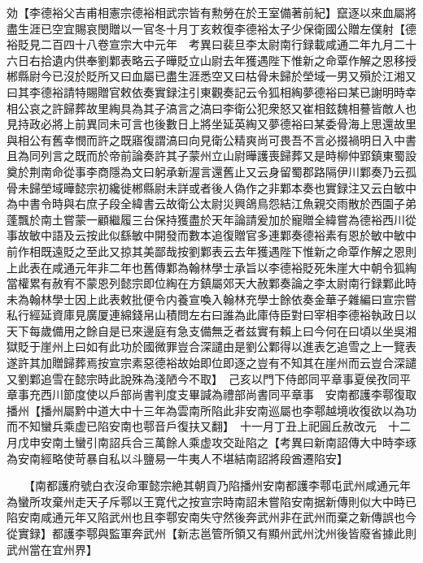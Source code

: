 効【李德裕父吉甫相憲宗德裕相武宗皆有勲勞在於王室備著前紀】竄逐以來血屬將盡生涯已空宜賜哀閔贈以一官冬十月丁亥敕復李德裕太子少保衛國公贈左僕射【德裕貶見二百四十八卷宣宗大中元年　考異曰裴旦李太尉南行録載咸通二年九月二十六日右拾遺内供奉劉鄴表略云子曄貶立山尉去年獲遇陛下惟新之命覃作解之恩移授郴縣尉今已沒於貶所又曰血屬已盡生涯悉空又曰枯骨未歸於塋域一男又殞於江湘又曰其李德裕請特賜贈官敕依奏實録注引東觀奏記云令狐相綯夢德裕曰某已謝明時幸相公哀之許歸葬故里綯具為其子滈言之滈曰李衛公犯衆怒又崔相鉉魏相謩皆敵人也見持政必將上前異同未可言也後數日上將坐延英綯又夢德裕曰某委骨海上思還故里與相公有舊幸憫而許之既寤復謂滈曰向見衛公精爽尚可畏吾不言必掇禍明日入中書且為同列言之既而於帝前論奏許其子蒙州立山尉曄護喪歸葬又是時柳仲郢鎮東蜀設奠於荆南命從事李商隱為文曰躬承新渥言還舊止又云身留蜀郡路隔伊川鄴奏乃云孤骨未歸塋域曄懿宗初纔徙郴縣尉未詳或者後人偽作之非鄴本奏也實録注又云白敏中為中書令時與右庶子段全緯書云故衛公太尉災興鴿鳥怨結江魚親交雨散於西園子弟蓬飄於南土嘗蒙一顧繼履三台保持獲盡於天年論請爰加於寵贈全緯嘗為德裕西川從事故敏中語及云按此似繇敏中開發而數本追復贈官多連鄴奏德裕素有恩於敏中敏中前作相既遠貶之至此又掠其美鄙哉按劉鄴表云去年獲遇陛下惟新之命覃作解之恩則上此表在咸通元年非二年也舊傳鄴為翰林學士承旨以李德裕貶死朱崖大中朝令狐綯當權累有赦宥不蒙恩列懿宗即位綯在方鎮屬郊天大赦鄴奏論之李太尉南行録鄴此時未為翰林學士因上此表敕批便令内養宣喚入翰林充學士餘依奏金華子雜編曰宣宗嘗私行經延資庫見廣厦連綿錢帛山積問左右曰誰為此庫侍臣對曰宰相李德裕執政日以天下每歲備用之餘自是已來邊庭有急支備無乏者兹實有賴上曰今何在曰頃以坐吳湘獄貶于崖州上曰如有此功於國微罪豈合深譴由是劉公鄴得以進表乞追雪之上一覽表遂許其加贈歸葬焉按宣宗素惡德裕故始即位即逐之豈有不知其在崖州而云豈合深譴又劉鄴追雪在懿宗時此說殊為淺陋今不取】　己亥以門下侍郎同平章事夏侯孜同平章事充西川節度使以戶部尚書判度支畢諴為禮部尚書同平章事　安南都護李鄠復取播州【播州屬黔中道大中十三年為雲南所陷此非安南巡屬也李鄠越境收復欲以為功而不知蠻兵乘虚已陷安南也鄠音戶復扶又翻】　十一月丁丑上祀圓丘赦改元　十二月戊申安南土蠻引南詔兵合三萬餘人乘虚攻交趾陷之【考異曰新南詔傳大中時李琢為安南經略使苛暴自私以斗鹽易一牛夷人不堪結南詔將段酋遷陷安】

　　【南都護府號白衣沒命軍懿宗絶其朝貢乃陷播州安南都護李鄠屯武州咸通元年為蠻所攻棄州走天子斥鄠以王寛代之按宣宗時南詔未嘗陷安南据新傳則似大中時已陷安南咸通元年又陷武州也且李鄠安南失守然後奔武州非在武州而棄之新傳誤也今從實録】都護李鄠與監軍奔武州【新志邕管所領又有顯州武州沈州後皆廢省據此則武州當在宜州界】

